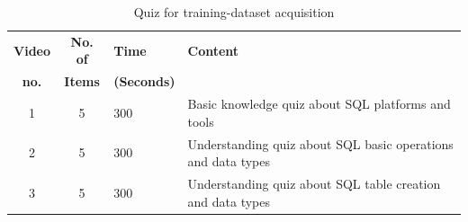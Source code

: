 \begin{table}[h]%
  \centering
	\caption{Quiz for training-dataset acquisition}
	\begin{tabular}{cclp{3cm}} \hline
		\textbf{Video} & \textbf{No. of} & \textbf{Time} & \textbf{Content}  \\ 
		\textbf{no.} & \textbf{Items} & \textbf{(Seconds)} &  \\ \hline
		1 & 5 & 300 & Basic knowledge quiz about SQL platforms and tools		\\
		2 & 5 & 300 & Understanding quiz about SQL basic operations and data types \\ 
		3 & 5 & 300 & Understanding quiz about SQL table creation and data types \\
		\hline
	\end{tabular}
	\label{quiz_train}
\end{table}



